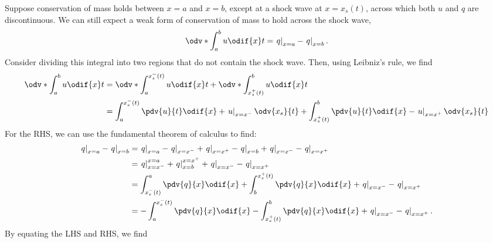 \documentclass{article}
\theoremstyle{definition}
\begin{document}
Suppose conservation of mass holds between \(x = a\) and \(x = b\),
except at a shock wave at \(x = x_s\left( t \right)\), across which
both \(u\) and \(q\) are discontinuous. We can still expect a weak form
of conservation of mass to hold across the shock wave,
\begin{equation*}
    \odv*{\int_a^b u \odif{x}}{t} = \left. q \right|_{x = a} - \left. q \right|_{x = b}.
\end{equation*}
Consider dividing this integral into two regions that do not contain
the shock wave. Then, using Leibniz's rule, we find
\begin{align*}
    \odv*{\int_a^b u \odif{x}}{t} & = \odv*{\int_a^{x_s^{-}\left( t \right)} u \odif{x}}{t} + \odv*{\int_{x_s^{+}\left( t \right)}^b u \odif{x}}{t}                                                                                       \\
                                  & = \int_a^{x_s^{-}\left( t \right)} \pdv{u}{t} \odif{x} + \left. u \right|_{x = x^{-}} \odv{x_s}{t} + \int_{x_s^{+}\left( t \right)}^b \pdv{u}{t} \odif{x} - \left. u \right|_{x = x^{+}} \odv{x_s}{t}
\end{align*}
For the RHS, we can use the fundamental theorem of calculus to find:
\begin{align*}
    \left. q \right|_{x = a} - \left. q \right|_{x = b} & = \left. q \right|_{x = a} - \left. q \right|_{x = x^{-}} + \left. q \right|_{x = x^{+}} - \left. q \right|_{x = b} + \left. q \right|_{x = x^{-}} - \left. q \right|_{x = x^{+}} \\
                                                        & = \left. q \right|_{x = x^{-}}^{x = a} + \left. q \right|_{x = b}^{x = x^{+}} + \left. q \right|_{x = x^{-}} - \left. q \right|_{x = x^{+}}                                       \\
                                                        & = \int_{x_s^{-}\left( t \right)}^a \pdv{q}{x} \odif{x} + \int_b^{x_s^{+}\left( t \right)} \pdv{q}{x} \odif{x} + \left. q \right|_{x = x^{-}} - \left. q \right|_{x = x^{+}}       \\
                                                        & = -\int_a^{x_s^{-}\left( t \right)} \pdv{q}{x} \odif{x} - \int_{x_s^{+}\left( t \right)}^b \pdv{q}{x} \odif{x} + \left. q \right|_{x = x^{-}} - \left. q \right|_{x = x^{+}}.
\end{align*}
By equating the LHS and RHS, we find
\end{document}
